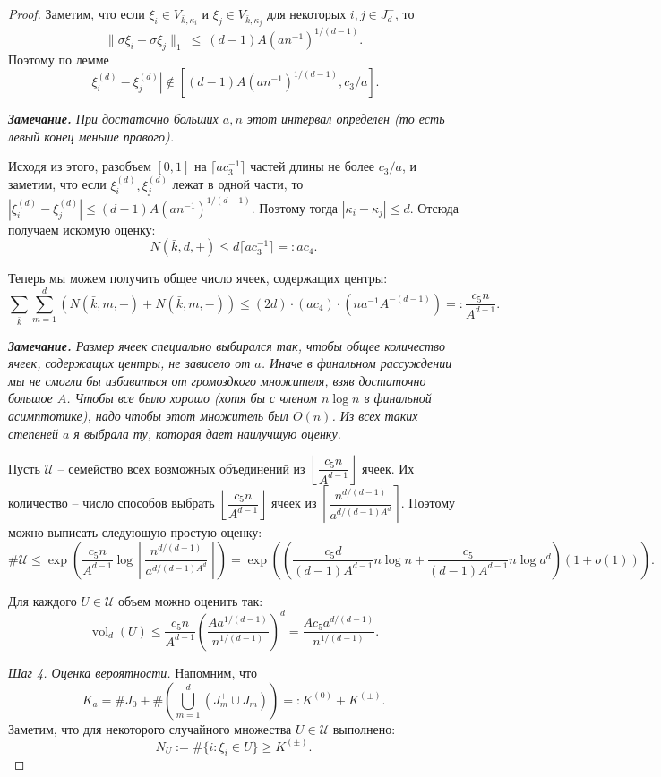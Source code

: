 \documentclass[12pt]{article}
\theoremstyle{plain}
\theoremstyle{definition}
\theoremstyle{remark}
\def\geq{\geqslant}
\def\leq{\leqslant}
\DeclareMathOperator{\vol}{vol}
\begin{document}
\begin{proof}
Заметим, что если $\xi_i\in V_{\bar k, \kappa_i}$ и $\xi_j\in V_{\bar k, \kappa_j}$ для некоторых $i, j\in J_d^+$, то $$\|\sigma\xi_i - \sigma\xi_j\|_1~\leq~(d-1)A(an^{-1})^{1/(d-1)}.$$ 
Поэтому по лемме $$|\xi_i^{(d)} - \xi_j^{(d)}| \not\in [(d-1)A(an^{-1})^{1/(d-1)}, c_3/a].$$

{\it {\bf Замечание.} При достаточно больших $a, n$ этот интервал определен (то есть левый конец меньше правого).}

Исходя из этого, разобъем $[0,1]$ на $\lceil ac_3^{-1}\rceil$ частей длины не более $c_3/a$, и заметим, что если $\xi_i^{(d)}, \xi_j^{(d)}$ лежат в одной части, то $|\xi_i^{(d)} - \xi_j^{(d)}| \leq (d-1)A(an^{-1})^{1/(d-1)}$. Поэтому тогда $|\kappa_i - \kappa_j|\leq d$. Отсюда получаем искомую оценку: $$N(\bar k, d, +)\leq d \lceil ac_3^{-1}\rceil =: ac_4.$$

Теперь мы можем получить общее число ячеек, содержащих центры: $$\sum_{\bar k}\sum_{m=1}^d (N(\bar k, m, +) + N(\bar k, m, -))\leq (2d)\cdot(ac_4)\cdot (na^{-1}A^{-(d-1)}) =: \dfrac{c_5 n}{A^{d-1}}.$$

{\it {\bf Замечание.} Размер ячеек специально выбирался так, чтобы общее количество ячеек, содержащих центры, не зависело от $a$. Иначе в финальном рассуждении мы не смогли бы избавиться от громоздкого множителя, взяв достаточно большое $A$. Чтобы все было хорошо (хотя бы с членом $n\log n$ в финальной асимптотике), надо чтобы этот множитель был $O(n)$. Из всех таких степеней $a$ я выбрала ту, которая дает наилучшую оценку.} 

Пусть $\mathcal{U}$ -- семейство всех возможных объединений из $\left\lfloor \dfrac{c_5 n}{A^{d-1}}\right\rfloor$ ячеек. Их количество -- число способов выбрать $\left\lfloor \dfrac{c_5 n}{A^{d-1}}\right\rfloor$ ячеек из $\left\lceil \dfrac{n^{d/(d-1)}}{a^{d/(d-1)A^d}}\right\rceil$. Поэтому можно выписать следующую простую оценку: $$\#\mathcal{U}\leq \exp \left(\dfrac{c_5 n}{A^{d-1}} \log \left\lceil \dfrac{n^{d/(d-1)}}{a^{d/(d-1)A^d}}\right\rceil \right) = \exp \left(\left(\dfrac{c_5d}{(d-1)A^{d-1}}n\log n + \dfrac{c_5}{(d-1)A^{d-1}}n\log a^d\right)(1+o(1))\right).$$ 

Для каждого $U\in \mathcal{U}$ объем можно оценить так: $$\vol_d (U)\leq \dfrac{c_5n}{A^{d-1}}\left(\dfrac{Aa^{1/(d-1)}}{n^{1/(d-1)}}\right)^d = \dfrac{Ac_5a^{d/(d-1)}}{n^{1/(d-1)}}.$$

{\it Шаг 4. Оценка вероятности.} Напомним, что $$K_a = \#J_0 + \#\left(\bigcup_{m=1}^d (J_m^+ \cup J_m^-)\right) =: K^{(0)} + K^{(\pm)}.$$
Заметим, что для некоторого случайного множества $U\in\mathcal{U}$ выполнено: $$N_U := \#\{i\colon \xi_i\in U\} \geq K^{(\pm)}.$$


\end{proof}
\end{document}
